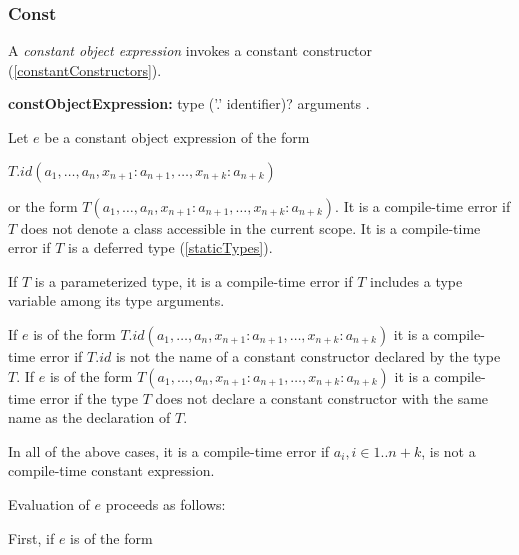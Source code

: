 \documentclass{article}
\begin{document}
\subsubsection{ Const}

\LMHash{}
A {\em constant object expression} invokes a constant constructor (\ref{constantConstructors}).

\begin{grammar}
{\bf constObjectExpression:}
\CONST{} type ('{\escapegrammar .}' identifier)? arguments
.
\end{grammar}

\LMHash{}
Let $e$ be a constant object expression of the form

\CONST{} $T.id(a_1, \ldots , a_n, x_{n+1}: a_{n+1}, \ldots , x_{n+k}: a_{n+k})$

or the form  \CONST{} $T(a_1, \ldots , a_n, x_{n+1}: a_{n+1}, \ldots , x_{n+k}: a_{n+k})$. It is a compile-time error if $T$ does not denote a class accessible in the current scope.  It is a compile-time error if $T$ is a deferred type (\ref{staticTypes}).


\LMHash{}
If $T$ is a parameterized type, it is a compile-time error if $T$ includes a type variable among its type arguments.

\LMHash{}
If $e$ is of the form \CONST{} $T.id(a_1, \ldots , a_n, x_{n+1}: a_{n+1}, \ldots , x_{n+k}: a_{n+k})$ it is a compile-time error if $T.id$ is not the name of a constant constructor declared by the type $T$. If $e$ is of the form  \CONST{} $T(a_1, \ldots , a_n, x_{n+1}: a_{n+1}, \ldots , x_{n+k}: a_{n+k})$ it is a compile-time error if the type $T$ does not declare a constant constructor with the same name as the declaration of $T$.

\LMHash{}
In all of the above cases, it is a compile-time error if $a_i,  i\in 1 .. n + k$, is not a compile-time constant expression.


\LMHash{}
Evaluation of $e$ proceeds as follows:

\LMHash{}
First, if $e$ is of the form
\end{document}
